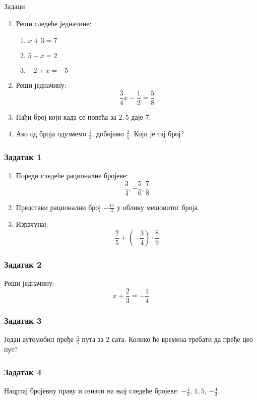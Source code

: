 \documentclass[11pt]{beamer}
\begin{document}
\begin{frame}{Задаци}
\begin{enumerate}
    \item Реши следеће једначине:
        \begin{enumerate}
            \item $x + 3 = 7$
            \item $5 - x = 2$
            \item $-2 + x = -5$
        \end{enumerate}
    \item Реши једначину:
        \[ \frac{3}{4}x - \frac{1}{2} = \frac{5}{8} \]
    \item Нађи број који када се повећа за $2,\!5$ даје $7$.
    \item Ако од броја одузмемо $\frac{1}{3}$,
        добијамо $\frac{2}{5}$. Који је тај број?
\end{enumerate}
\end{frame}

\begin{frame}
\frametitle{Задатак 1}
\begin{enumerate}
    \item Пореди следеће рационалне бројеве: 
        \[ \frac{3}{4}, -\frac{5}{6}, \frac{7}{8} \]
    \item Представи рационални број $-\frac{11}{3}$ у облику мешовитог броја.
    \item Израчунај:
        \[ \frac{2}{5} + \left(-\frac{3}{4}\right) \cdot \frac{8}{9} \]
\end{enumerate}
\end{frame}

\begin{frame}
\frametitle{Задатак 2}
Реши једначину:
\[ x + \frac{2}{3} = -\frac{1}{4} \]
\end{frame}

\begin{frame}
\frametitle{Задатак 3}
Један аутомобил пређе $\frac{3}{5}$ пута за $2$ сата.
Колико ће времена требати да пређе цео пут?
\end{frame}

\begin{frame}
\frametitle{Задатак 4}
Нацртај бројевну праву и означи на њој следеће бројеве:
$-\frac{1}{2}$, $1,\!5$, $-\frac{4}{3}$.
\end{frame}
\end{document}
